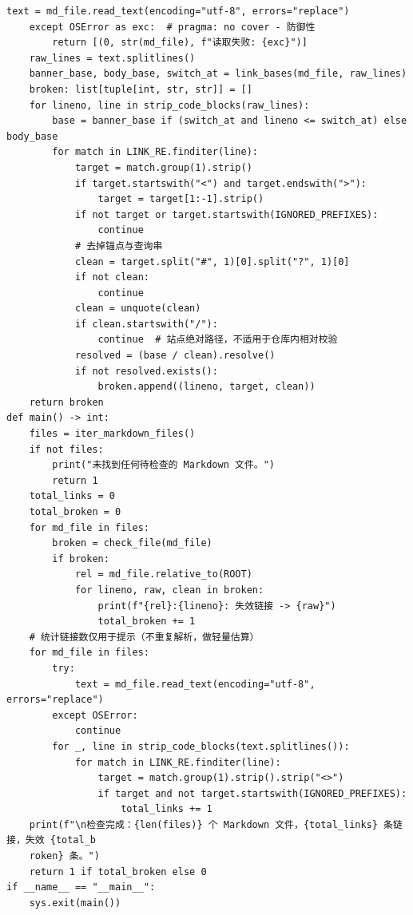 \documentclass[10pt,a4paper]{article}
\newenvironment{yatpage}{\vspace*{0pt}}{\par}
\begin{document}
\newpage
\begin{yatpage}
\begin{Verbatim}[fontsize=\fontsize{8.2}{9.8}\selectfont]
        text = md_file.read_text(encoding="utf-8", errors="replace")
    except OSError as exc:  # pragma: no cover - 防御性
        return [(0, str(md_file), f"读取失败: {exc}")]
    raw_lines = text.splitlines()
    banner_base, body_base, switch_at = link_bases(md_file, raw_lines)
    broken: list[tuple[int, str, str]] = []
    for lineno, line in strip_code_blocks(raw_lines):
        base = banner_base if (switch_at and lineno <= switch_at) else body_base
        for match in LINK_RE.finditer(line):
            target = match.group(1).strip()
            if target.startswith("<") and target.endswith(">"):
                target = target[1:-1].strip()
            if not target or target.startswith(IGNORED_PREFIXES):
                continue
            # 去掉锚点与查询串
            clean = target.split("#", 1)[0].split("?", 1)[0]
            if not clean:
                continue
            clean = unquote(clean)
            if clean.startswith("/"):
                continue  # 站点绝对路径，不适用于仓库内相对校验
            resolved = (base / clean).resolve()
            if not resolved.exists():
                broken.append((lineno, target, clean))
    return broken
def main() -> int:
    files = iter_markdown_files()
    if not files:
        print("未找到任何待检查的 Markdown 文件。")
        return 1
    total_links = 0
    total_broken = 0
    for md_file in files:
        broken = check_file(md_file)
        if broken:
            rel = md_file.relative_to(ROOT)
            for lineno, raw, clean in broken:
                print(f"{rel}:{lineno}: 失效链接 -> {raw}")
                total_broken += 1
    # 统计链接数仅用于提示（不重复解析，做轻量估算）
    for md_file in files:
        try:
            text = md_file.read_text(encoding="utf-8", errors="replace")
        except OSError:
            continue
        for _, line in strip_code_blocks(text.splitlines()):
            for match in LINK_RE.finditer(line):
                target = match.group(1).strip().strip("<>")
                if target and not target.startswith(IGNORED_PREFIXES):
                    total_links += 1
    print(f"\n检查完成：{len(files)} 个 Markdown 文件，{total_links} 条链接，失效 {total_b
    roken} 条。")
    return 1 if total_broken else 0
if __name__ == "__main__":
    sys.exit(main())
\end{Verbatim}
\end{yatpage}
\end{document}
